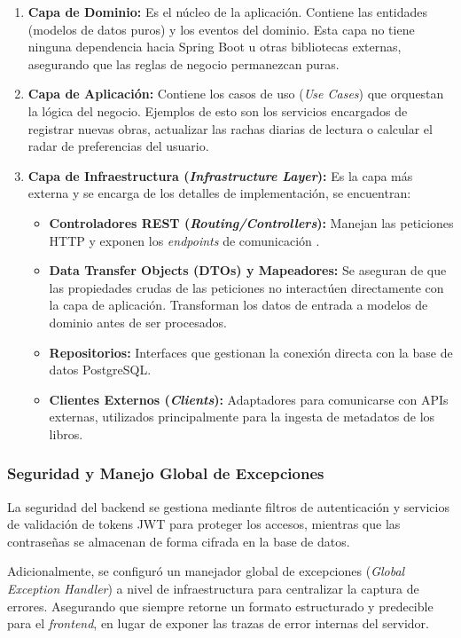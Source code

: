 \documentclass[12pt, atypical, journal]{article}
\begin{document}
\begin{enumerate}
    \item \textbf{Capa de Dominio:} Es el núcleo de la aplicación. Contiene las entidades (modelos de datos puros) y los eventos del dominio. Esta capa no tiene ninguna dependencia hacia Spring Boot u otras bibliotecas externas, asegurando que las reglas de negocio permanezcan puras.
    
    \item \textbf{Capa de Aplicación:} Contiene los casos de uso (\textit{Use Cases}) que orquestan la lógica del negocio. Ejemplos de esto son los servicios encargados de registrar nuevas obras, actualizar las rachas diarias de lectura o calcular el radar de preferencias del usuario.
    
    \item \textbf{Capa de Infraestructura (\textit{Infrastructure Layer}):} Es la capa más externa y se encarga de los detalles de implementación, se encuentran: 
    \begin{itemize}
        \item \textbf{Controladores REST (\textit{Routing/Controllers}):} Manejan las peticiones HTTP y exponen los \textit{endpoints} de comunicación .
        \item \textbf{Data Transfer Objects (DTOs) y Mapeadores:} Se aseguran de que las propiedades crudas de las peticiones no interactúen directamente con la capa de aplicación. Transforman los datos de entrada a modelos de dominio antes de ser procesados.
        \item \textbf{Repositorios:} Interfaces que gestionan la conexión directa con la base de datos PostgreSQL.
        \item \textbf{Clientes Externos (\textit{Clients}):} Adaptadores para comunicarse con APIs externas, utilizados principalmente para la ingesta de metadatos de los libros.
    \end{itemize}
\end{enumerate}

\subsubsection{Seguridad y Manejo Global de Excepciones}
La seguridad del backend se gestiona mediante filtros de autenticación y servicios de validación de tokens JWT para proteger los accesos, mientras que las contraseñas se almacenan de forma cifrada en la base de datos.

Adicionalmente, se configuró un manejador global de excepciones (\textit{Global Exception Handler}) a nivel de infraestructura para centralizar la captura de errores. Asegurando que siempre retorne un formato estructurado y predecible para el \textit{frontend}, en lugar de exponer las trazas de error internas del servidor.
\end{document}
